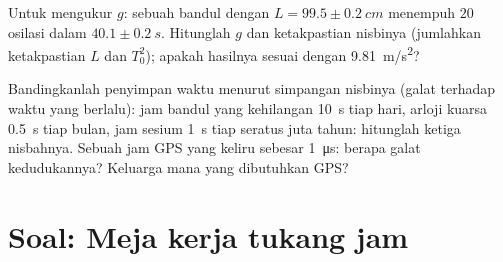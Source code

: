 \begin{exercise}[$\star\star\star$]\label{exo:g12:oscillators-and-time:14}
Untuk mengukur $g$: sebuah bandul dengan $L = 99.5 \pm \qty{0.2}{cm}$ menempuh
$20$ osilasi dalam $40.1 \pm \qty{0.2}{s}$. Hitunglah $g$ dan
ketakpastian nisbinya (jumlahkan ketakpastian $L$ dan $T_0^2$); apakah hasilnya
sesuai dengan \qty{9.81}{m/s^2}?
\end{exercise}

\begin{exercise}[$\star\star\star$]\label{exo:g12:oscillators-and-time:15}
Bandingkanlah penyimpan waktu menurut simpangan nisbinya (galat terhadap waktu
yang berlalu): jam bandul yang kehilangan \qty{10}{s} tiap hari, arloji kuarsa
\qty{0.5}{s} tiap bulan, jam sesium \qty{1}{s} tiap seratus juta
tahun: hitunglah ketiga nisbahnya. Sebuah jam GPS yang keliru sebesar
\qty{1}{\micro s}: berapa galat kedudukannya? Keluarga mana yang dibutuhkan GPS?
\end{exercise}

\section{Soal: Meja kerja tukang jam}

